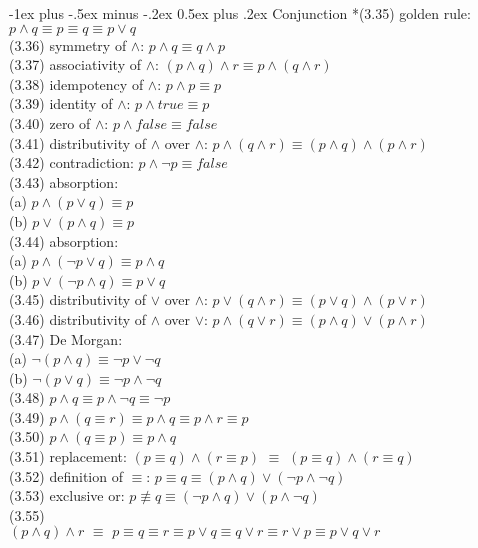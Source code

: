 \documentclass[10pt,landscape]{article}
\makeatletter
\renewcommand{\subsection}{\@startsection{subsection}{2}{0mm}%
                                {-1ex plus -.5ex minus -.2ex}%
                                {0.5ex plus .2ex}%
                                {\normalfont\small\bfseries}}
\makeatother
\begin{document}
\begin{multicols}{3}
{\subsection{Conjunction}
*(3.35) golden rule: $p\land q\equiv p\equiv q\equiv p\lor q$\\
(3.36) symmetry of $\land$: $p\land q\equiv q\land p$\\
(3.37) associativity of $\land$: $(p\land q)\land r\equiv p\land (q\land r)$\\
(3.38) idempotency of $\land$: $p\land p\equiv p$\\
(3.39) identity of $\land$: $p\land true\equiv p$\\
(3.40) zero of $\land$: $p\land false\equiv false$\\
(3.41) distributivity of $\land$ over $\land$: $p\land(q\land r)\equiv (p\land q)\land(p\land r)$\\
(3.42) contradiction: $p\land \neg p\equiv false$\\
(3.43) absorption:\\
\qquad(a) $p\land (p\lor q)\equiv p$\\
\qquad(b) $p\lor (p\land q)\equiv p$\\
(3.44) absorption:\\
\qquad(a) $p\land (\neg p\lor q)\equiv p\land q$\\
\qquad(b) $p\lor (\neg p\land q)\equiv p\lor q$\\
(3.45) distributivity of $\lor$ over $\land$: $p\lor (q\land r)\equiv (p\lor q)\land (p\lor r)$\\
(3.46) distributivity of $\land$ over $\lor$: $p\land (q\lor r)\equiv (p\land q)\lor (p\land r)$\\
(3.47) De Morgan:\\
\qquad(a) $\neg(p\land q)\equiv \neg p\lor \neg q$\\
\qquad(b) $\neg(p\lor q)\equiv \neg p\land \neg q$\\
(3.48) $p\land q\equiv p\land \neg q\equiv \neg p$\\
(3.49) $p\land (q\equiv r)\equiv p\land q\equiv p\land r\equiv p$\\
(3.50) $p\land (q\equiv p)\equiv p\land q$\\
(3.51) replacement: $(p\equiv q)\land (r\equiv p)\,\, \equiv\,\, (p\equiv q)\land (r\equiv q)$\\
(3.52) definition of $\equiv$: $p\equiv q\equiv (p\land q)\lor (\neg p\land \neg q)$\\
(3.53) exclusive or: $p\not\equiv q\equiv (\neg p\land q)\lor (p\land \neg q)$\\
(3.55)\\
$(p\land q)\land r\,\,\equiv\,\, p\equiv q\equiv r\equiv p\lor q\equiv q\lor r\equiv r\lor p\equiv p\lor q\lor r$

}
\end{multicols}
\end{document}
